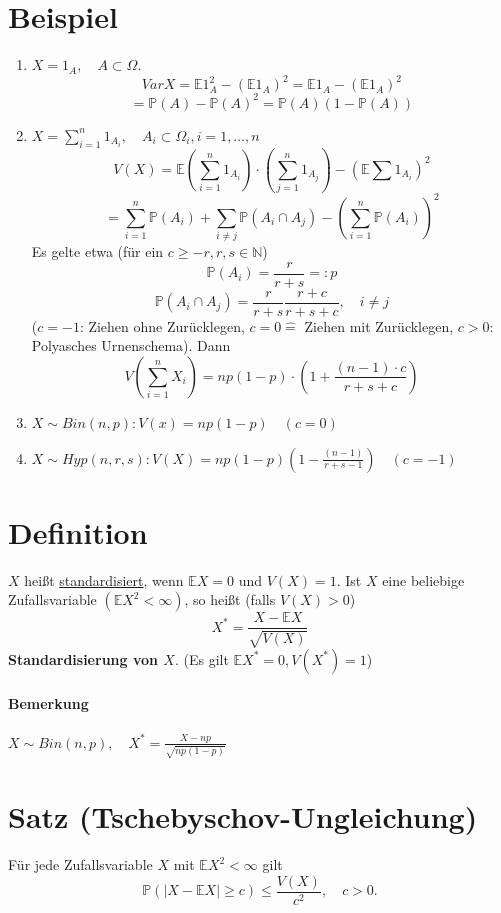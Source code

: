 \documentclass[a4paper,11pt,notitlepage]{report}
\newcommand{\N}{{\ensuremath{\mathbb{N}}}}
\newcommand{\Prim}{{\ensuremath{\mathbb{P}}}}
\newcommand{\E}{{\ensuremath{\mathbb{E}}}}
\begin{document}
\section{Beispiel}
\begin{enumerate}
	\item $X = 1_A, \quad A \subset \Omega$.
		$$Var X = \E 1_A^2 - (\E 1_A)^2 = \E 1_A - (\E 1_A)^2$$
		$$= \Prim(A)-\Prim(A)^2 = \Prim(A) (1 - \Prim(A))$$
	\item $X= \sum\limits_{i=1}^n{1_{A_i}}, \quad A_i \subset \Omega_i, i=1, \ldots, n$
		$$V(X) = \E \left(\sum\limits_{i=1}^n{1_{A_i}}\right) \cdot \left(\sum\limits_{j=1}^n{1_{A_j}}\right) - (\E \sum{1_{A_i}})^2$$
		$$ = \sum\limits_{i=1}^n{\Prim(A_i)} + \sum\limits_{i \neq j}{\Prim(A_i \cap A_j)} - (\sum\limits_{i=1}^n{\Prim(A_i)})^2$$
		Es gelte etwa (für ein $c \geq -r, r, s \in \N$)
		$$\Prim(A_i) = \frac{r}{r+s} =: p$$
		$$\Prim(A_i \cap A_j) = \frac{r}{r+s} \frac{r+c}{r+s+c}, \quad i \neq j$$
		($c=-1$: Ziehen ohne Zurücklegen, $c=0 \hat{=}$ Ziehen mit Zurücklegen, $c>0$: Polyasches Urnenschema). Dann
		$$V\left(\sum\limits_{i=1}^n{X_i}\right) = n p (1-p) \cdot \left(1 + \frac{(n-1) \cdot c}{r+s+c}\right)$$
	\item $X \sim Bin(n,p): V(x) = n p (1-p) \quad (c=0)$ \newline
	\item $X \sim Hyp (n,r,s): V(X) = n p (1-p) \left(1 - \frac{(n-1)}{r+s-1}\right) \quad (c=-1)$
\end{enumerate}

\section{Definition}
$X$ heißt \underline{standardisiert}, wenn $\E X = 0$ und $V(X)=1$. Ist $X$ eine beliebige Zufallsvariable $( \E X^2 < \infty)$, so heißt (falls $V(X)>0$)
$$X^* = \frac{X - \E X}{\sqrt{V(X)}}$$
\textbf{Standardisierung von $X$}. (Es gilt $\E X^* = 0, V(X^*) = 1$)

\paragraph{Bemerkung}
$X \sim Bin(n,p),\quad X^* = \frac{X-np}{\sqrt{n p (1-p)}}$

\section{Satz (Tschebyschov-Ungleichung)}
Für jede Zufallsvariable $X$ mit $\E X^2 < \infty$ gilt
$$\Prim(|X-\E X| \geq c) \leq \frac{V(X)}{c^2}, \quad c > 0.$$
\end{document}
